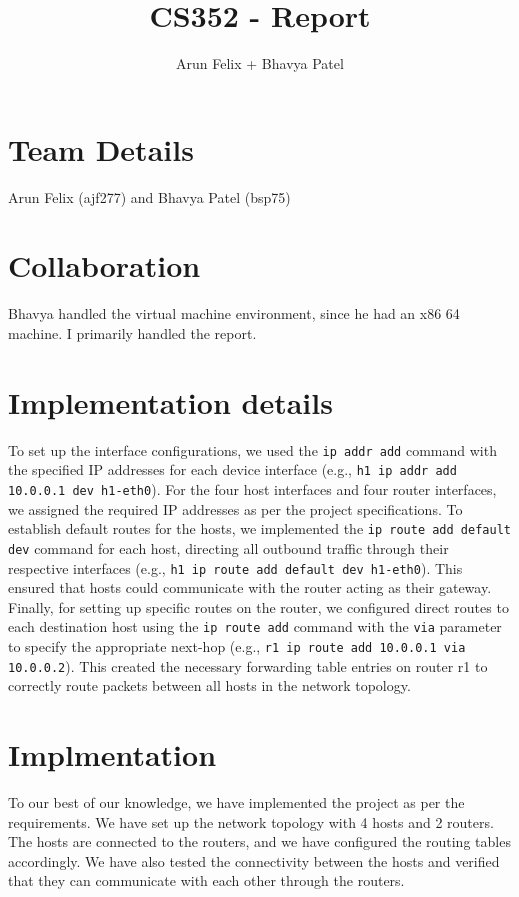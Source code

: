 \documentclass{article}
\title{CS352 - Report}
\author{Arun Felix + Bhavya Patel}
\begin{document}
\maketitle
\section{Team Details}

Arun Felix (ajf277) and Bhavya Patel (bsp75)

\section{Collaboration}

Bhavya handled the virtual machine environment, since he had an x86 64 machine. I primarily handled the report.

\section{Implementation details}
To set up the interface configurations, we used the \texttt{ip addr add} command with the specified IP addresses for each device interface (e.g., \texttt{h1 ip addr add 10.0.0.1 dev h1-eth0}). For the four host interfaces and four router interfaces, we assigned the required IP addresses as per the project specifications. To establish default routes for the hosts, we implemented the \texttt{ip route add default dev} command for each host, directing all outbound traffic through their respective interfaces (e.g., \texttt{h1 ip route add default dev h1-eth0}). This ensured that hosts could communicate with the router acting as their gateway. Finally, for setting up specific routes on the router, we configured direct routes to each destination host using the \texttt{ip route add} command with the \texttt{via} parameter to specify the appropriate next-hop (e.g., \texttt{r1 ip route add 10.0.0.1 via 10.0.0.2}). This created the necessary forwarding table entries on router r1 to correctly route packets between all hosts in the network topology.

\section{Implmentation}
To our best of our knowledge, we have implemented the project as per the requirements. We have set up the network topology with 4 hosts and 2 routers. The hosts are connected to the routers, and we have configured the routing tables accordingly. We have also tested the connectivity between the hosts and verified that they can communicate with each other through the routers.
\end{document}
